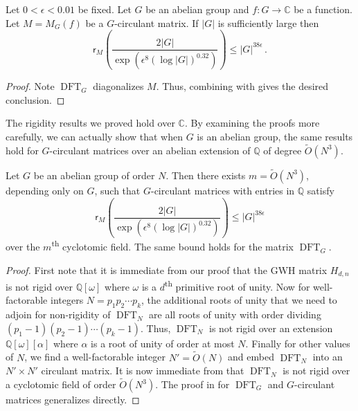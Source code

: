 \documentclass{toc}
\renewcommand\Q{{\mathbb{Q}}}
\renewcommand\C{{\mathbb{C}}}
\newcommand{\ts}{\textsuperscript}
\DeclareMathOperator{\DFT}{DFT}
\begin{document}
\begin{theorem}\label{allabelian}
  Let $0 < \epsilon < 0.01$ be fixed.  Let $G$ be an abelian group and $f: G \rightarrow \C$ be a function. Let $M = M_G(f)$ be a %
$G$-circulant matrix.  If $|G|$ is sufficiently large then
\[
\textsf{r}_M\left(\frac{2|G|}{\exp\left(\epsilon^8 (\log |G|)^{0.32}\right)} \right) \leq |G|^{38 \epsilon} \,.
\]
\end{theorem}
\begin{proof}

Note $\DFT_G$ diagonalizes $M$.  Thus, combining 
with   gives the
%
desired conclusion.
\end{proof}


%
The rigidity results we proved hold over $\C$.  By examining the proofs more carefully, we can actually show that when $G$ is an abelian group, the same results hold for $G$-circulant matrices over an
%
abelian   %
extension of $\Q$ of degree $\tilde{O}(N^3)$.
\begin{theorem}\label{thm:extension_degree}
Let $G$ be an abelian group of order $N$.  Then there exists $m = \tilde{O}(N^3)$, depending only on $G$, such that $G$-circulant matrices with entries in $\Q$ satisfy
\[
\textsf{r}_M\left(\frac{2|G|}{\exp\left(\epsilon^8 (\log |G|)^{0.32}\right)} \right) \leq |G|^{38 \epsilon}
\]
over the $m$\ts{th} cyclotomic field.  The same bound holds for the matrix $\DFT_G$.
\end{theorem}
\begin{proof}
First note that it is immediate from our proof that the GWH matrix $H_{d,n}$ is not rigid over $\Q[\omega]$ where $\omega$ is a
$d$\ts{th}  %
primitive root of unity. 
%
Now for well-factorable integers $N = p_1p_2 \cdots p_k$, the additional roots of unity that we need to adjoin for non-rigidity of $\DFT_N$ are all roots of unity with order dividing $(p_1-1)(p_2-1) \cdots (p_k - 1)$.  Thus, $\DFT_N$ is not rigid over an extension $\Q[\omega][\alpha]$ where $\alpha$
%
is a root of unity of order at most $N$.  %
Finally for other values of $N$, we find a well-factorable integer $N' = \tilde{O}(N)$ and embed $\DFT_N$ into an $N' \times  N'$ circulant matrix.  It is now immediate from  that $\DFT_N$ is not rigid over a cyclotomic field of order $\tilde{O}(N^3)$.  The proof in  for  $\DFT_G$ and $G$-circulant matrices generalizes directly.  
\end{proof}
%
\end{document}
